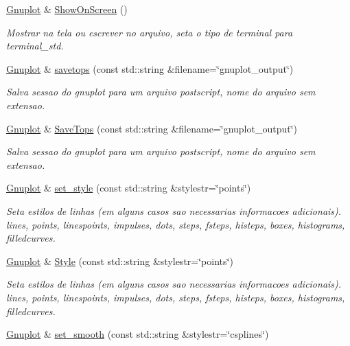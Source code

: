 \begin{DoxyCompactItemize}
\hyperlink{class_gnuplot}{Gnuplot} \& \hyperlink{class_gnuplot_aee70cb6dfc893d6f19976fa9042c8e7c}{Show\+On\+Screen} ()
\begin{DoxyCompactList}\small\item\em Mostrar na tela ou escrever no arquivo, seta o tipo de terminal para terminal\+\_\+std. \end{DoxyCompactList}\item 
\hyperlink{class_gnuplot}{Gnuplot} \& \hyperlink{class_gnuplot_a032072c7c01b508a7535a17fb08562b1}{savetops} (const std\+::string \&filename=\char`\"{}gnuplot\+\_\+output\char`\"{})
\begin{DoxyCompactList}\small\item\em Salva sessao do gnuplot para um arquivo postscript, nome do arquivo sem extensao. \end{DoxyCompactList}\item 
\hyperlink{class_gnuplot}{Gnuplot} \& \hyperlink{class_gnuplot_a5adf74dfda6d9d70a16c435fedf07625}{Save\+Tops} (const std\+::string \&filename=\char`\"{}gnuplot\+\_\+output\char`\"{})
\begin{DoxyCompactList}\small\item\em Salva sessao do gnuplot para um arquivo postscript, nome do arquivo sem extensao. \end{DoxyCompactList}\item 
\hyperlink{class_gnuplot}{Gnuplot} \& \hyperlink{class_gnuplot_acfdcda292650775ebed4683e8e1515b5}{set\+\_\+style} (const std\+::string \&stylestr=\char`\"{}points\char`\"{})
\begin{DoxyCompactList}\small\item\em Seta estilos de linhas (em alguns casos sao necessarias informacoes adicionais). lines, points, linespoints, impulses, dots, steps, fsteps, histeps, boxes, histograms, filledcurves. \end{DoxyCompactList}\item 
\hyperlink{class_gnuplot}{Gnuplot} \& \hyperlink{class_gnuplot_ae64e911770994ba05cc2f6dcbfe31540}{Style} (const std\+::string \&stylestr=\char`\"{}points\char`\"{})
\begin{DoxyCompactList}\small\item\em Seta estilos de linhas (em alguns casos sao necessarias informacoes adicionais). lines, points, linespoints, impulses, dots, steps, fsteps, histeps, boxes, histograms, filledcurves. \end{DoxyCompactList}\item 
\hyperlink{class_gnuplot}{Gnuplot} \& \hyperlink{class_gnuplot_aa18386919da2ec4c994f1f9c7195d384}{set\+\_\+smooth} (const std\+::string \&stylestr=\char`\"{}csplines\char`\"{})

\end{DoxyCompactItemize}
